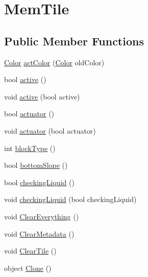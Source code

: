 \hypertarget{classOTA_1_1Memory_1_1MemTile}{}\section{Mem\+Tile}
\label{classOTA_1_1Memory_1_1MemTile}
\subsection*{Public Member Functions}
\begin{DoxyCompactItemize}
\item 
\hyperlink{structMicrosoft_1_1Xna_1_1Framework_1_1Color}{Color} \hyperlink{classOTA_1_1Memory_1_1MemTile_a0bd25b30a88fb3f0ea649b57b770474f}{act\+Color} (\hyperlink{structMicrosoft_1_1Xna_1_1Framework_1_1Color}{Color} old\+Color)
\item 
bool \hyperlink{classOTA_1_1Memory_1_1MemTile_a0cb3050c8a4f6bdb2c1f727eec8d9701}{active} ()
\item 
void \hyperlink{classOTA_1_1Memory_1_1MemTile_af9fc9f49e798e732e3c4193d8b841a45}{active} (bool active)
\item 
bool \hyperlink{classOTA_1_1Memory_1_1MemTile_a08235e6470163e162616da9ca214f0a2}{actuator} ()
\item 
void \hyperlink{classOTA_1_1Memory_1_1MemTile_a0df0332048ebd19fcbb584aa71616a89}{actuator} (bool actuator)
\item 
int \hyperlink{classOTA_1_1Memory_1_1MemTile_adcec7b7f2017235a4afdae1f41b7100c}{block\+Type} ()
\item 
bool \hyperlink{classOTA_1_1Memory_1_1MemTile_a84866542df1329ca5c48ab5cd2a04c67}{bottom\+Slope} ()
\item 
bool \hyperlink{classOTA_1_1Memory_1_1MemTile_a153b184a78a61e53a44ab37b48e2ed51}{checking\+Liquid} ()
\item 
void \hyperlink{classOTA_1_1Memory_1_1MemTile_acbb9e072519cfbb6ade2970243b8d2a9}{checking\+Liquid} (bool checking\+Liquid)
\item 
void \hyperlink{classOTA_1_1Memory_1_1MemTile_a997681b312cab1dfc4f33ddfe15ab2bf}{Clear\+Everything} ()
\item 
void \hyperlink{classOTA_1_1Memory_1_1MemTile_a1857d520978db31224024e9c172f0f43}{Clear\+Metadata} ()
\item 
void \hyperlink{classOTA_1_1Memory_1_1MemTile_af855857ebbc6db110779f3c5da994ec8}{Clear\+Tile} ()
\item 
object \hyperlink{classOTA_1_1Memory_1_1MemTile_ae2ed43906a9888a668bcfb815620d9b3}{Clone} ()

\end{DoxyCompactItemize}
